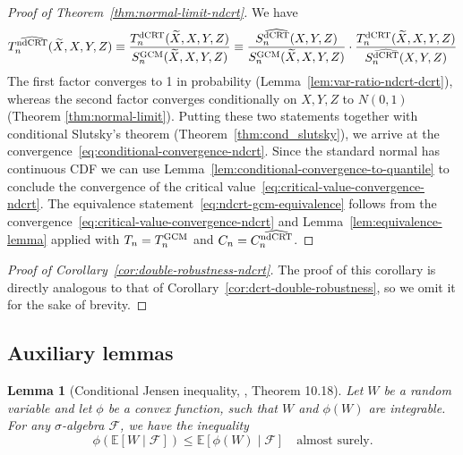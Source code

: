 \documentclass[aos]{imsart}
\theoremstyle{plain}
\newtheorem{lemma}{Lemma}
\theoremstyle{remark}
\newcommand{\E}{\mathbb E}								%
\newcommand{\srx}{X}									%
\newcommand{\srz}{Z}									%
\newcommand{\srxk}{\widetilde X}						%
\newcommand{\sry}{Y}									%
\newcommand{\dCRT}{\textnormal{dCRT}} 					%
\newcommand{\GCM}{\textnormal{GCM}}						%
\newcommand{\dCRThat}{\widehat{\textnormal{dCRT}}}		%
\newcommand{\ndCRThat}{\widehat{\textnormal{ndCRT}}}	%
\begin{document}
\begin{proof}[Proof of Theorem~\ref{thm:normal-limit-ndcrt}]
We have
\begin{equation*}
T_n^{\ndCRThat}(\srxk, \srx, \sry, \srz) \equiv \frac{T_n^{\dCRT}(\srxk, \srx, \sry, \srz)}{S_n^{\GCM}(\srxk, \srx, \sry, \srz)} \equiv  \frac{S_n^{\dCRThat}(\srx, \sry, \srz)}{S_n^{\GCM}(\srxk, \srx, \sry, \srz)} \cdot \frac{T_n^{\dCRT}(\srxk, \srx, \sry, \srz)}{S_n^{\dCRThat}(\srx, \sry, \srz)}
\end{equation*}
The first factor converges to 1 in probability (Lemma~\ref{lem:var-ratio-ndcrt-dcrt}), whereas the second factor converges conditionally on $\srx, \sry, \srz$ to $N(0,1)$ (Theorem \ref{thm:normal-limit}). Putting these two statements together with conditional Slutsky's theorem (Theorem~\ref{thm:cond_slutsky}), we arrive at the convergence~\eqref{eq:conditional-convergence-ndcrt}. Since the standard normal has continuous CDF we can use Lemma~\ref{lem:conditional-convergence-to-quantile} to conclude the convergence of the critical value~\eqref{eq:critical-value-convergence-ndcrt}. The equivalence statement~\eqref{eq:ndcrt-gcm-equivalence} follows from the convergence~\eqref{eq:critical-value-convergence-ndcrt} and Lemma~\ref{lem:equivalence-lemma} applied with $T_n = T_n^{\GCM}$ and $C_n = C_n^{\ndCRThat}$.
\end{proof}

\begin{proof}[Proof of Corollary~\ref{cor:double-robustness-ndcrt}] 
 
The proof of this corollary is directly analogous to that of Corollary~\ref{cor:dcrt-double-robustness}, so we omit it for the sake of brevity.

\end{proof}


\subsection{Auxiliary lemmas}

\begin{lemma}[Conditional Jensen inequality, \cite{Davidson2003}, Theorem 10.18] \label{lem:conditional-jensen}
Let $W$ be a random variable and let $\phi$ be a convex function, such that $W$ and $\phi(W)$ are integrable. For any $\sigma$-algebra $\mathcal F$, we have the inequality
\begin{equation*}
	\phi(\E[W \mid \mathcal F]) \leq  \E[\phi(W) \mid \mathcal F] \quad \text{almost surely}.
\end{equation*}
\end{lemma}
\end{document}
